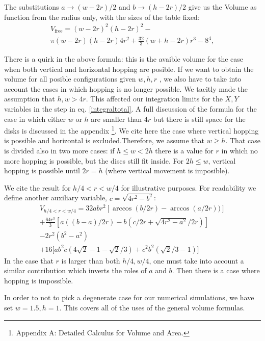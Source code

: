 \documentclass[letterpaper,10pt, jcp, aps]{revtex4-1}
\begin{document}
The substitutions $a\rightarrow (w-2r)/2$ and $b\rightarrow (h-2r)/2$ give us
 the Volume as function from the radius only, with the sizes of the table fixed:
\begin{multline}\label{volumewhd}
 V_\text{free} 
= (w-2r)^{2} (h-2r)^{2}  - \\ 
 \pi (w-2r)(h-2r) 4 r^{2} + 
\textstyle \frac{32}{3} (w+h-2r) r^{3}  
- 8^{4},
\end{multline}

There is a quirk in the above formula:
this is the avaible volume for the case when both
vertical and horizontal hopping are posible.
If we want to obtain the volume for all posible configurations
given $w,h,r$ ,
we also have to take into account the cases in which hopping is no
longer possible. 
We tacitly made the assumption that $h,w>4r$.  This affected our 
integration limits for the $X,Y$ variables in the step in eq. \ref{integraltotal}. 
A full discussion of the formula for the case in which either
$w$ or $h$ are smaller than $4r$ but there is still space for
the disks is discussed in the appendix
\footnote{Appendix A: Detailed Calculus for Volume and Area.}.
We cite here the case where vertical hopping is possible
and horizontal is excluded.Therefore, we assume that $w \geq h$.
That case is divided also in two more cases: if
$ h \leq  w < 2 h $ there is a value for $r$ in which no more hopping is possible,
but the discs still fit inside. For $ 2 h \leq w $, vertical hopping is
possible until $ 2 r= h$ (where vertical movement is imposible).

We cite the  result for $h/4  <r< w/4$ for illustrative purposes.
For readability we define another auxiliary variable,
$c=\sqrt{4r^2-b^2}$:
\begin{multline}\label{VolumenCasoFeo}
V_{h/4<r<w/4} = 32abr^2[\arccos(b/2r)-\arccos(a/2r))]\\
+\frac{64 r^3}{3 }[a((b-a)/2r)-b(c/2r+\sqrt{4r^2-a^2}/2r)]\\
-2r^2 (b^2-a^2)\\ 
+16[ a b^2 c (4\sqrt{2}-1-\sqrt{2}/3)
+c^2b^2 (\sqrt{2}/3-1) \big]
\end{multline}
In the case that $r$ is larger than both $h/4, w/4$, one must take
into account a similar
contribution which inverts the roles of $a$ and $b$. Then there is
a case where hopping is impossible. 


In order to not to pick a degenerate case for our numerical simulations,
we have set $w=1.5, h=1$. This covers all of the uses of the general volume formulas.
\end{document}
